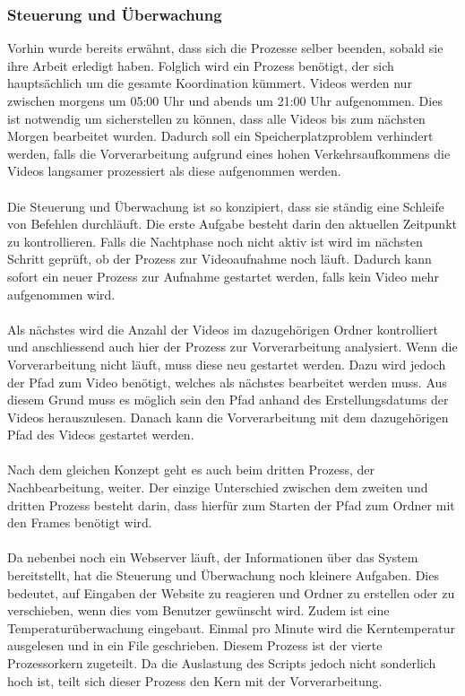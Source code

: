 \subsubsection{Steuerung und Überwachung}
Vorhin wurde bereits erwähnt, dass sich die Prozesse selber beenden, sobald sie ihre Arbeit erledigt haben. Folglich wird ein Prozess benötigt, der sich hauptsächlich um die gesamte Koordination kümmert. Videos werden nur zwischen morgens um 05:00 Uhr und abends um 21:00 Uhr aufgenommen. Dies ist notwendig um sicherstellen zu können, dass alle Videos bis zum nächsten Morgen bearbeitet wurden. Dadurch soll ein Speicherplatzproblem verhindert werden, falls die Vorverarbeitung aufgrund eines hohen Verkehrsaufkommens die Videos langsamer prozessiert als diese aufgenommen werden.\\\\
Die Steuerung und Überwachung ist so konzipiert, dass sie ständig eine Schleife von Befehlen durchläuft. Die erste Aufgabe besteht darin den aktuellen Zeitpunkt zu kontrollieren. Falls die Nachtphase noch nicht aktiv ist wird im nächsten Schritt geprüft, ob der Prozess zur Videoaufnahme noch läuft. Dadurch kann sofort ein neuer Prozess zur Aufnahme gestartet werden, falls kein Video mehr aufgenommen wird.\\\\
Als nächstes wird die Anzahl der Videos im dazugehörigen Ordner kontrolliert und anschliessend auch hier der Prozess zur Vorverarbeitung analysiert. Wenn die Vorverarbeitung nicht läuft, muss diese neu gestartet werden. Dazu wird jedoch der Pfad zum Video benötigt, welches als nächstes bearbeitet werden muss. Aus diesem Grund muss es möglich sein den Pfad anhand des Erstellungsdatums der Videos herauszulesen. Danach kann die Vorverarbeitung mit dem dazugehörigen Pfad des Videos gestartet werden.\\\\
Nach dem gleichen Konzept geht es auch beim dritten Prozess, der Nachbearbeitung, weiter. Der einzige Unterschied zwischen dem zweiten und dritten Prozess besteht darin, dass hierfür zum Starten der Pfad zum Ordner mit den Frames benötigt wird.\\\\
Da nebenbei noch ein Webserver läuft, der Informationen über das System bereitstellt, hat die Steuerung und Überwachung noch kleinere Aufgaben. Dies bedeutet, auf Eingaben der Website zu reagieren und Ordner zu erstellen oder zu verschieben, wenn dies vom Benutzer gewünscht wird. Zudem ist eine Temperaturüberwachung eingebaut. Einmal pro Minute wird die Kerntemperatur ausgelesen und in ein File geschrieben. Diesem Prozess ist der vierte Prozessorkern zugeteilt. Da die Auslastung des Scripts jedoch nicht sonderlich hoch ist, teilt sich dieser Prozess den Kern mit der Vorverarbeitung. \cite{Bash}\\\\

